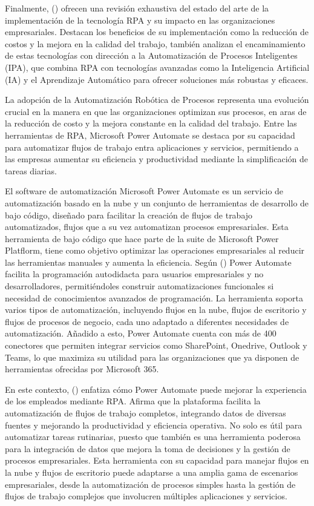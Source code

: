 \documentclass[letter,oneside,12pt,spanish]{report}
\begin{document}
\noindent Finalmente, (\cite{gami2019rpa}) ofrecen una revisión exhaustiva del estado del arte de la implementación de la tecnología RPA y su impacto en las organizaciones empresariales. Destacan los beneficios de su implementación como la reducción de costos y la mejora en la calidad del trabajo, también analizan el encaminamiento de estas tecnologías con dirección a la Automatización de Procesos Inteligentes (IPA), que combina RPA con tecnologías avanzadas como la Inteligencia Artificial (IA) y el Aprendizaje Automático para ofrecer soluciones más robustas y eficaces. 

\noindent La adopción de la Automatización Robótica de Procesos representa una evolución crucial en la manera en que las organizaciones optimizan sus procesos, en aras de la reducción de costo y la mejora constante en la calidad del trabajo. Entre las herramientas de RPA, Microsoft Power Automate se destaca por su capacidad para automatizar flujos de trabajo entra aplicaciones y servicios, permitiendo a las empresas aumentar su eficiencia y productividad mediante la simplificación de tareas diarias.

\noindent El software de automatización Microsoft Power Automate es un servicio de automatización basado en la nube y un conjunto de herramientas de desarrollo de bajo código, diseñado para facilitar la creación de flujos de trabajo automatizados, flujos que a su vez automatizan procesos empresariales. Esta herramienta de bajo código que hace parte de la suite de Microsoft Power Platflorm, tiene como objetivo optimizar las operaciones empresariales al reducir las herramientas manuales y aumenta la eficiencia. Según (\cite{najjar2023powerautomate}) Power Automate facilita la programación autodidacta para usuarios empresariales y no desarrolladores, permitiéndoles construir automatizaciones funcionales si necesidad de conocimientos avanzados de programación. La herramienta soporta varios tipos de automatización, incluyendo flujos en la nube, flujos de escritorio y flujos de procesos de negocio, cada uno adaptado a diferentes necesidades de automatización. Añadido a esto, Power Automate cuenta con más de 400 conectores que permiten integrar servicios como SharePoint, Onedrive, Outlook y Teams, lo que maximiza su utilidad para las organizaciones que ya disponen de herramientas ofrecidas por Microsoft 365.

\noindent En este contexto, (\cite{vartiainen2024leanrpa}) enfatiza cómo Power Automate puede mejorar la experiencia de los empleados mediante RPA. Afirma que la plataforma facilita la automatización de flujos de trabajo completos, integrando datos de diversas fuentes y mejorando la productividad y eficiencia operativa. No solo es útil para automatizar tareas rutinarias, puesto que también es una herramienta poderosa para la integración de datos que mejora la toma de decisiones y la gestión de procesos empresariales. Esta herramienta con su capacidad para manejar flujos en la nube y flujos de escritorio puede adaptarse a una amplia gama de escenarios empresariales, desde la automatización de procesos simples hasta la gestión de flujos de trabajo complejos que involucren múltiples aplicaciones y servicios.
\end{document}
